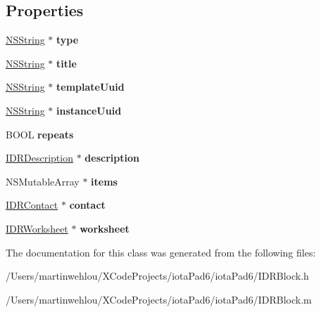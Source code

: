 \subsection*{Properties}
\begin{DoxyCompactItemize}
\item 
\hypertarget{interface_i_d_r_block_a80297eebc0abc876907ab15d3690ce61}{
\hyperlink{class_n_s_string}{NSString} $\ast$ {\bfseries type}}
\label{interface_i_d_r_block_a80297eebc0abc876907ab15d3690ce61}

\item 
\hypertarget{interface_i_d_r_block_a426f9a9fe1114faeb0502625f2c6c745}{
\hyperlink{class_n_s_string}{NSString} $\ast$ {\bfseries title}}
\label{interface_i_d_r_block_a426f9a9fe1114faeb0502625f2c6c745}

\item 
\hypertarget{interface_i_d_r_block_aa1fd5bfa2459247efbd6f06e247ab0cb}{
\hyperlink{class_n_s_string}{NSString} $\ast$ {\bfseries templateUuid}}
\label{interface_i_d_r_block_aa1fd5bfa2459247efbd6f06e247ab0cb}

\item 
\hypertarget{interface_i_d_r_block_acaba3219a2b4d51df3f093f822477c85}{
\hyperlink{class_n_s_string}{NSString} $\ast$ {\bfseries instanceUuid}}
\label{interface_i_d_r_block_acaba3219a2b4d51df3f093f822477c85}

\item 
\hypertarget{interface_i_d_r_block_aa3d4128d5c9c737d97147e465ad1086c}{
BOOL {\bfseries repeats}}
\label{interface_i_d_r_block_aa3d4128d5c9c737d97147e465ad1086c}

\item 
\hypertarget{interface_i_d_r_block_aa666085c2b12b21111779303b6449ea6}{
\hyperlink{interface_i_d_r_description}{IDRDescription} $\ast$ {\bfseries description}}
\label{interface_i_d_r_block_aa666085c2b12b21111779303b6449ea6}

\item 
\hypertarget{interface_i_d_r_block_acbdb82005195638a298c3d2ebde78260}{
NSMutableArray $\ast$ {\bfseries items}}
\label{interface_i_d_r_block_acbdb82005195638a298c3d2ebde78260}

\item 
\hypertarget{interface_i_d_r_block_ab7326cc26375c6711ba3349dd6b20963}{
\hyperlink{interface_i_d_r_contact}{IDRContact} $\ast$ {\bfseries contact}}
\label{interface_i_d_r_block_ab7326cc26375c6711ba3349dd6b20963}

\item 
\hypertarget{interface_i_d_r_block_adc637401c3574fcae9527892fcae6194}{
\hyperlink{interface_i_d_r_worksheet}{IDRWorksheet} $\ast$ {\bfseries worksheet}}
\label{interface_i_d_r_block_adc637401c3574fcae9527892fcae6194}

\end{DoxyCompactItemize}


The documentation for this class was generated from the following files:\begin{DoxyCompactItemize}
\item 
/Users/martinwehlou/XCodeProjects/iotaPad6/iotaPad6/IDRBlock.h\item 
/Users/martinwehlou/XCodeProjects/iotaPad6/iotaPad6/IDRBlock.m\end{DoxyCompactItemize}
